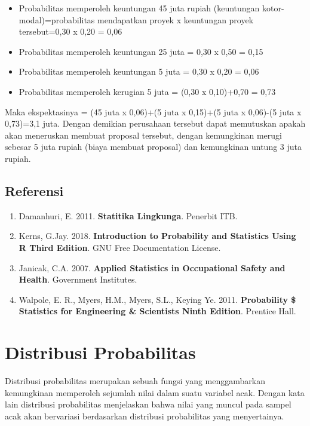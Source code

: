 \documentclass[]{book}
\providecommand{\tightlist}{%
  \setlength{\itemsep}{0pt}\setlength{\parskip}{0pt}}
\begin{document}
\begin{itemize}
\tightlist
\item
  Probabilitas memperoleh keuntungan 45 juta rupiah (keuntungan
  kotor-modal)=probabilitas mendapatkan proyek x keuntungan proyek
  tersebut=0,30 x 0,20 = 0,06
\item
  Probabilitas memperoleh keuntungan 25 juta = 0,30 x 0,50 = 0,15
\item
  Probabilitas memperoleh keuntungan 5 juta = 0,30 x 0,20 = 0,06
\item
  Probabilitas memperoleh kerugian 5 juta = (0,30 x 0,10)+0,70 = 0,73
\end{itemize}

Maka ekspektasinya = (45 juta x 0,06)+(5 juta x 0,15)+(5 juta x 0,06)-(5
juta x 0,73)=3,1 juta. Dengan demikian perusahaan tersebut dapat
memutuskan apakah akan meneruskan membuat proposal tersebut, dengan
kemungkinan merugi sebesar 5 juta rupiah (biaya membuat proposal) dan
kemungkinan untung 3 juta rupiah.

\section{Referensi}\label{referensi-7}

\begin{enumerate}
\def\labelenumi{\arabic{enumi}.}
\tightlist
\item
  Damanhuri, E. 2011. \textbf{Statitika Lingkunga}. Penerbit ITB.
\item
  Kerns, G.Jay. 2018. \textbf{Introduction to Probability and Statistics
  Using R Third Edition}. GNU Free Documentation License.
\item
  Janicak, C.A. 2007. \textbf{Applied Statistics in Occupational Safety
  and Health}. Government Institutes.
\item
  Walpole, E. R., Myers, H.M., Myers, S.L., Keying Ye. 2011.
  \textbf{Probability \$ Statistics for Engineering \& Scientists Ninth
  Edition}. Prentice Hall.
\end{enumerate}

\chapter{Distribusi Probabilitas}\label{distribusi-probabilitas}

Distribusi probabilitas merupakan sebuah fungsi yang menggambarkan
kemungkinan memperoleh sejumlah nilai dalam suatu variabel acak. Dengan
kata lain distribusi probabilitas menjelaskan bahwa nilai yang muncul
pada sampel acak akan bervariasi berdasarkan distribusi probabilitas
yang menyertainya.
\end{document}
